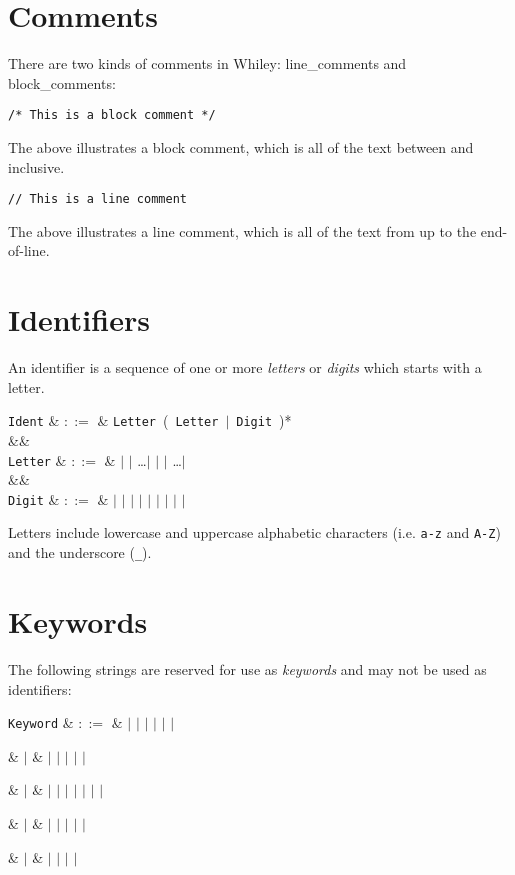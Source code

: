 \pagebreak
\section{Comments}
There are two kinds of comments in Whiley: \gls{line_comment}s and \gls{block_comment}s:
\begin{lstlisting}
/* This is a block comment */
\end{lstlisting}
The above illustrates a block comment, which is all of the text between \token{/*} and \token{*/} inclusive.
\begin{lstlisting}
// This is a line comment
\end{lstlisting}
The above illustrates a line comment, which is all of the text from \token{//} up to the end-of-line.

\section{Identifiers}
An identifier is a sequence of one or more {\em letters} or {\em digits} which starts with a letter.
\begin{syntax}
\verb+Ident+ & $::=$ & \verb+Letter+\ \big(\ \verb+Letter+\ $|$\ \verb+Digit+\ \big)*\\
&&\\
\verb+Letter+ & $::=$ & \token{\_} $|$  $|$ \ldots $|$  $|$  $|$ \ldots $|$ \\
&&\\
\verb+Digit+ & $::=$ &  $|$  $|$  $|$  $|$  $|$  $|$  $|$  $|$  $|$ \\
\end{syntax}

Letters include lowercase and uppercase alphabetic characters (i.e. \lstinline+a-z+ and \lstinline+A-Z+) and the underscore (\lstinline+_+).

\section{Keywords}
The following strings are reserved for use as {\em keywords} and may not be used as identifiers:

\begin{syntax}
\verb+Keyword+ & $::=$ &  $|$  $|$
 $|$  $|$  $|$  $|$
\\
{\huge\strut} & $|$ &  $|$  $|$  $|$  $|$  $|$ \\
{\huge\strut} & $|$ &  $|$  $|$  $|$  $|$  $|$  $|$  $|$ \\
{\huge\strut} & $|$ &  $|$  $|$  $|$  $|$  $|$ \\
{\huge\strut} & $|$ &  $|$  $|$  $|$  $|$ \\

\end{syntax}

